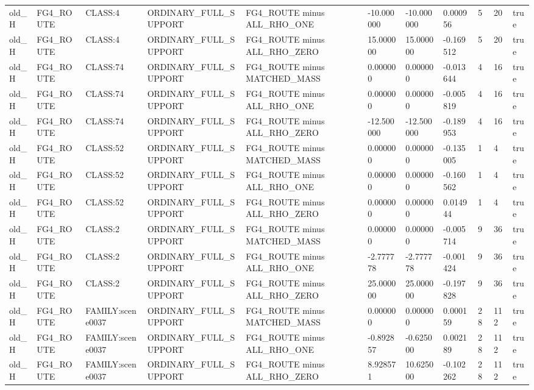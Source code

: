 \begin{tabular}{lllllllllll}
old\_H & FG4\_ROUTE & CLASS:4 & ORDINARY\_FULL\_SUPPORT & FG4\_ROUTE minus ALL\_RHO\_ONE & -10.000000 & -10.000000 & 0.000956 & 5 & 20 & true \\
old\_H & FG4\_ROUTE & CLASS:4 & ORDINARY\_FULL\_SUPPORT & FG4\_ROUTE minus ALL\_RHO\_ZERO & 15.000000 & 15.000000 & -0.169512 & 5 & 20 & true \\
old\_H & FG4\_ROUTE & CLASS:74 & ORDINARY\_FULL\_SUPPORT & FG4\_ROUTE minus MATCHED\_MASS & 0.000000 & 0.000000 & -0.013644 & 4 & 16 & true \\
old\_H & FG4\_ROUTE & CLASS:74 & ORDINARY\_FULL\_SUPPORT & FG4\_ROUTE minus ALL\_RHO\_ONE & 0.000000 & 0.000000 & -0.005819 & 4 & 16 & true \\
old\_H & FG4\_ROUTE & CLASS:74 & ORDINARY\_FULL\_SUPPORT & FG4\_ROUTE minus ALL\_RHO\_ZERO & -12.500000 & -12.500000 & -0.189953 & 4 & 16 & true \\
old\_H & FG4\_ROUTE & CLASS:52 & ORDINARY\_FULL\_SUPPORT & FG4\_ROUTE minus MATCHED\_MASS & 0.000000 & 0.000000 & -0.135005 & 1 & 4 & true \\
old\_H & FG4\_ROUTE & CLASS:52 & ORDINARY\_FULL\_SUPPORT & FG4\_ROUTE minus ALL\_RHO\_ONE & 0.000000 & 0.000000 & -0.160562 & 1 & 4 & true \\
old\_H & FG4\_ROUTE & CLASS:52 & ORDINARY\_FULL\_SUPPORT & FG4\_ROUTE minus ALL\_RHO\_ZERO & 0.000000 & 0.000000 & 0.014944 & 1 & 4 & true \\
old\_H & FG4\_ROUTE & CLASS:2 & ORDINARY\_FULL\_SUPPORT & FG4\_ROUTE minus MATCHED\_MASS & 0.000000 & 0.000000 & -0.005714 & 9 & 36 & true \\
old\_H & FG4\_ROUTE & CLASS:2 & ORDINARY\_FULL\_SUPPORT & FG4\_ROUTE minus ALL\_RHO\_ONE & -2.777778 & -2.777778 & -0.001424 & 9 & 36 & true \\
old\_H & FG4\_ROUTE & CLASS:2 & ORDINARY\_FULL\_SUPPORT & FG4\_ROUTE minus ALL\_RHO\_ZERO & 25.000000 & 25.000000 & -0.197828 & 9 & 36 & true \\
old\_H & FG4\_ROUTE & FAMILY:scene0037 & ORDINARY\_FULL\_SUPPORT & FG4\_ROUTE minus MATCHED\_MASS & 0.000000 & 0.000000 & 0.000159 & 28 & 112 & true \\
old\_H & FG4\_ROUTE & FAMILY:scene0037 & ORDINARY\_FULL\_SUPPORT & FG4\_ROUTE minus ALL\_RHO\_ONE & -0.892857 & -0.625000 & 0.002189 & 28 & 112 & true \\
old\_H & FG4\_ROUTE & FAMILY:scene0037 & ORDINARY\_FULL\_SUPPORT & FG4\_ROUTE minus ALL\_RHO\_ZERO & 8.928571 & 10.625000 & -0.102262 & 28 & 112 & true \\

\end{tabular}
